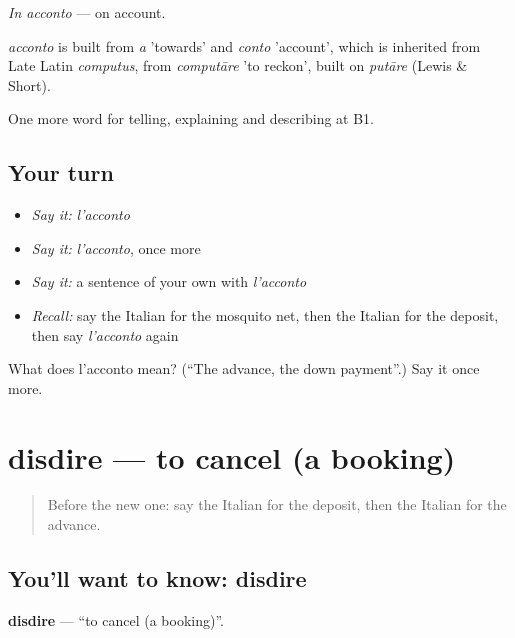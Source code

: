 \emph{In acconto} — on account.

\begin{cousinweb}
\emph{acconto} is built from \emph{a} 'towards' and \emph{conto} 'account', which is inherited from Late Latin \emph{computus}, from \emph{computāre} 'to reckon', built on \emph{putāre} (Lewis \& Short).
\end{cousinweb}

\begin{grammarlens}[title={What you've built}]
One more word for telling, explaining and describing at B1.
\end{grammarlens}

\subsection*{Your turn}
\begin{itemize}
\raggedright
  \item \emph{Say it:} \emph{l'acconto}
  \item \emph{Say it:} \emph{l'acconto}, once more
  \item \emph{Say it:} a sentence of your own with \emph{l'acconto}
  \item \emph{Recall:} say the Italian for the mosquito net, then the Italian for the deposit, then say \emph{l'acconto} again
\end{itemize}

\begin{tcolorbox}[breakable,colback=teal!4,colframe=teal!35!black,title={Before you move on}]
What does l'acconto mean? (\textquotedblleft{}The advance, the down payment\textquotedblright{}.) Say it once more.
\end{tcolorbox}
\section[disdire]{disdire — to cancel (a booking)}

\label{lesson:IT-C431-disdire}



\begin{quote}
Before the new one: say the Italian for the deposit, then the Italian for the advance.
\end{quote}

\subsection*{You'll want to know: disdire}
\textbf{disdire} — \textquotedblleft{}to cancel (a booking)\textquotedblright{}.


